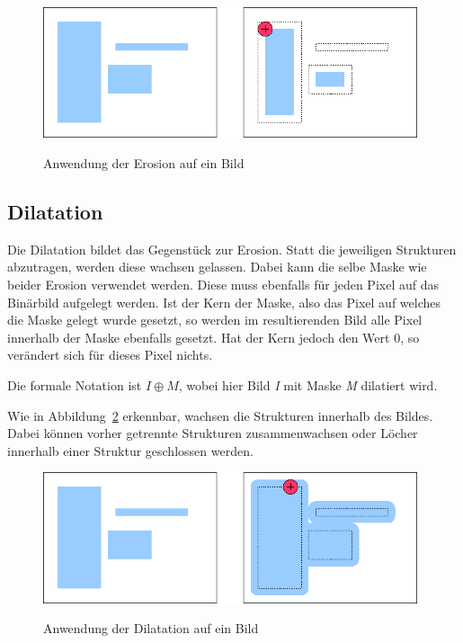 \begin{figure}[ht]
   \centering
     \includegraphics[width=11cm]{Bilder/MorphologicalErosion} \\
 \caption{Anwendung der Erosion auf ein Bild}
 \label{fig:Erosion}
\end{figure}

\subsection{Dilatation}
Die Dilatation bildet das Gegenstück zur Erosion. Statt die jeweiligen Strukturen abzutragen, werden diese wachsen gelassen.
Dabei kann die selbe Maske wie beider Erosion verwendet werden. Diese muss ebenfalls für jeden Pixel auf das Binärbild aufgelegt werden. Ist der Kern der Maske, also das Pixel auf welches die Maske gelegt wurde gesetzt, so werden im resultierenden Bild alle Pixel innerhalb der Maske ebenfalls gesetzt. Hat der Kern jedoch den
Wert 0, so verändert sich für dieses Pixel nichts.

Die formale Notation ist $ I \oplus M $, wobei hier Bild {\em I} mit Maske {\em M} dilatiert wird.

Wie in Abbildung~\ref{fig:Dilation} erkennbar, wachsen die Strukturen innerhalb des Bildes. Dabei können vorher getrennte Strukturen zusammenwachsen oder Löcher innerhalb einer Struktur geschlossen werden.

\begin{figure}[ht]
   \centering
     \includegraphics[width=11cm]{Bilder/MorphologicalDilation} \\
 \caption{Anwendung der Dilatation auf ein Bild}
 \label{fig:Dilation}
\end{figure}

